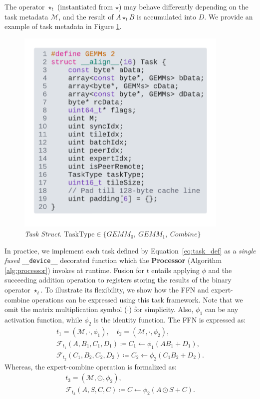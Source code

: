 The operator $\star_t$ (instantiated from $\star$) may behave differently depending on the task metadata $\mathcal{M}$,
and the result of $A \star_t B$ is accumulated into $D$.
We provide an example of task metadata in Figure \ref{fig:task}.
\begin{figure}[!ht]
    \centering
    \includegraphics[width=4in]{figures/task}
    \caption{\emph{Task Struct}. $\text{TaskType} \in \{GEMM_0,\>GEMM_1,\>Combine\}$}
    \label{fig:task}
\end{figure}

In practice, we implement each task defined by Equation~\ref{eq:task_def} as a \emph{single fused} \verb|__device__|
decorated function which the \textbf{Processor} (Algorithm \ref{alg:processor}) invokes at runtime.
Fusion for $t$ entails applying $\phi$ and the succeeding addition operation to registers
storing the results of the binary operator $\star_t$.
To illustrate its flexibility, we show how the FFN and expert-combine operations can be expressed
using this task framework.
Note that we omit the matrix multiplication symbol ($\cdot$) for simplicity.
Also, $\phi_1$ can be any activation function, while $\phi_2$ is the identity function.
The FFN is expressed as:
\begin{gather*}
    t_1 = (\mathcal{M}, \cdot, \phi_1), \quad t_2 = (\mathcal{M}, \cdot, \phi_2), \\
    \mathcal{F}_{t_1}(A, B_1, C_1, D_1) \coloneqq C_1 \gets \phi_1\left(A B_1 + D_1\right), \\
    \mathcal{F}_{t_2}(C_1, B_2, C_2, D_2) \coloneqq C_2 \gets \phi_2\left(C_1 B_2 + D_2\right).
\end{gather*}
Whereas, the expert-combine operation is formalized as:
\begin{gather*}
    t_3 = (\mathcal{M}, \odot, \phi_2), \\
    \mathcal{F}_{t_3}(A, S, C, C) \coloneqq C \gets \phi_2\left(A \odot S + C\right).
\end{gather*}

